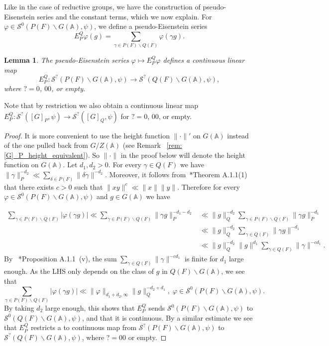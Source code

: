 \documentclass[letterpaper,11pt]{amsart}
\newcommand{\bA}{\mathbb{A}}
\newcommand{\cS}{\mathcal{S}}
\newcommand{\bs}{\backslash}
\newcommand{\<}{\negthickspace}
\providecommand{\aabs}[1]{\lVert#1\rVert}
\theoremstyle{definition}
\theoremstyle{plain}
\newtheorem{lemma}[definition]{Lemma}
\theoremstyle{remark}
\numberwithin{equation}{section}
\begin{document}
Like in the case of reductive groups, we have
the construction of pseudo-Eisenstein series and the constant terms, which we
now explain. For $\varphi \in \cS^0(P(F) \bs G(\bA),\psi)$, we define a
pseudo-Eisenstein series
    \[
    E_P^Q \varphi(g) = \sum_{\gamma \in P(F) \backslash Q(F)} \varphi(\gamma g).
    \]

\begin{lemma}   \label{lemma:convergence_of_pseudo_eisenstein}
The pseudo-Eisenstein series $\varphi \mapsto E_P^Q \varphi$ defines a
continuous linear map
    \[
    E_P^Q: \cS^{?}(P(F) \bs G(\bA),\psi) \to \cS^?(Q(F) \bs G(\bA),\psi),
    \]
where $? = 0$, $00$, or empty.
\end{lemma}

Note that by restriction we also obtain a continuous linear map $E_P^Q : \cS^{?}([G]_P,\psi) \to \cS^?([G]_Q,\psi)$ for $? = 0$, $00$, or empty.

\begin{proof}
It is more convenient to use the height function $\| \cdot \|'$ on $G(\bA)$ instead of the one pulled back from $G/Z(\bA)$ (see Remark ~\ref{rem:[G]_P_height_equivalent}). So $\| \cdot \|$ in the proof below will denote the height function on $G(\bA)$. Let $d_1, d_2>0$. For every $\gamma \in Q(F)$ we have $\aabs{\gamma}_P^{-d_2} \ll \sum_{\delta \in P(F)} \aabs{ \delta \gamma}^{-d_2}$. Moreover, it follows from~\cite{BP1}*{Theorem A.1.1(1)} that there exists $c>0$ such that $\aabs{xy}^c \ll \aabs{x} \aabs{y}$. Therefore for every $\varphi \in \cS^0(P(F) \bs G(\bA),\psi)$ and $g \in G(\bA)$ we have

\begin{align*}
   \sum_{\gamma \in P(F) \backslash Q(F)} \left|\varphi(\gamma g)  \right| \ll\sum_{\gamma \in P(F) \backslash Q(F)} \aabs{\gamma g}_P^{-d_1-d_2}  &\ll \aabs{g}^{-d_2}_Q  \sum_{\gamma \in P(F) \backslash Q(F)} \aabs{\gamma g}_P^{-d_1}  \\
   & \ll \aabs{g}^{-d_2}_Q  \sum_{\gamma \in Q(F)} \aabs{\gamma g}^{-d_1} \\
    & \ll \aabs{g}^{-d_2}_Q  \aabs{g}^{d_1} \sum_{\gamma \in Q(F)} \aabs{\gamma}^{- cd_1}.
\end{align*}
By ~\cite{BP1}*{Proposition A.1.1~(v)}, the sum $\sum_{\gamma \in Q(F)}\|\gamma\|^{-cd_1}$ is finite for $d_1$ large enough. As the LHS only depends on the class of $g$ in $Q(F) \backslash G(\bA)$, we see that
\begin{equation*}
    \sum_{\gamma \in P(F) \backslash Q(F)} \left|\varphi(\gamma g)  \right| \ll  \aabs{\varphi}_{d_1+d_2,\infty} \aabs{g}_Q^{-d_2+d_1}, \; \varphi \in \cS^0(P(F) \bs G(\bA),\psi).
\end{equation*}
By taking $d_2$ large enough, this shows that $E_P^Q$ sends $\cS^0(P(F) \bs G(\bA),\psi)$ to $\cS^0(Q(F) \bs
G(\bA),\psi)$, and that it is continuous. By a similar estimate we see that $E_P^Q$ restricts a to continuous
map from $\cS^{?}(P(F) \bs G(\bA),\psi)$ to $\cS^{?}(Q(F) \bs G(\bA),\psi)$,
where $? = 00$ or empty.
\end{proof}
\end{document}
